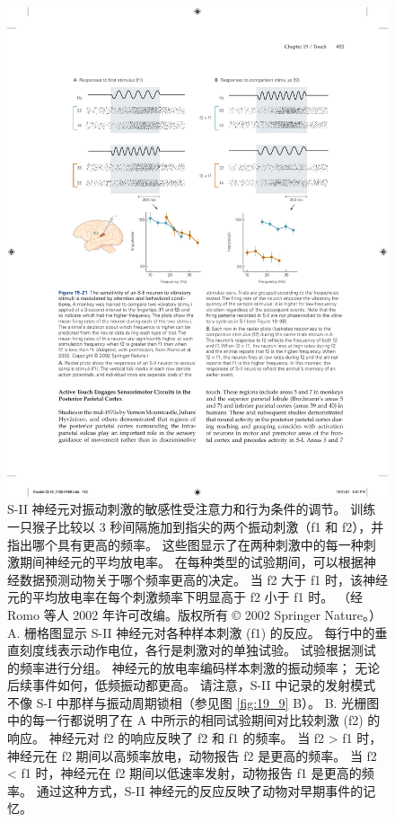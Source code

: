 \begin{figure}[htbp]
	\centering
	\includegraphics[width=1.0\linewidth]{chap19/fig_19_21}
	\caption{S-II 神经元对振动刺激的敏感性受注意力和行为条件的调节。 
		训练一只猴子比较以 3 秒间隔施加到指尖的两个振动刺激（f1 和 f2），并指出哪个具有更高的频率。 
		这些图显示了在两种刺激中的每一种刺激期间神经元的平均放电率。 
		在每种类型的试验期间，可以根据神经数据预测动物关于哪个频率更高的决定。 
		当 f2 大于 f1 时，该神经元的平均放电率在每个刺激频率下明显高于 f2 小于 f1 时。 （经 Romo 等人 2002 年许可改编。版权所有 © 2002 Springer Nature。） 
		A. 栅格图显示 S-II 神经元对各种样本刺激 (f1) 的反应。 
		每行中的垂直刻度线表示动作电位，各行是刺激对的单独试验。 
		试验根据测试的频率进行分组。 
		神经元的放电率编码样本刺激的振动频率； 无论后续事件如何，低频振动都更高。 
		请注意，S-II 中记录的发射模式不像 S-I 中那样与振动周期锁相（参见图 \ref{fig:19_9} B）。 
		B. 光栅图中的每一行都说明了在 A 中所示的相同试验期间对比较刺激 (f2) 的响应。
		神经元对 f2 的响应反映了 f2 和 f1 的频率。 
		当 f2 > f1 时，神经元在 f2 期间以高频率放电，动物报告 f2 是更高的频率。 
		当 f2 < f1 时，神经元在 f2 期间以低速率发射，动物报告 f1 是更高的频率。 
		通过这种方式，S-II 神经元的反应反映了动物对早期事件的记忆。}
	\label{fig:19_21}
\end{figure}

